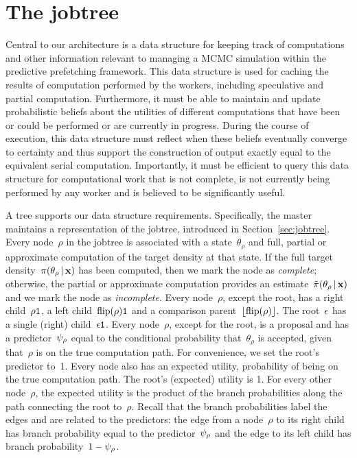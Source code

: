 \documentclass[angelino.tex]{subfiles}
\begin{document}

\section{The jobtree}
\label{sec:the-jobtree}

Central to our architecture is a data structure for
keeping track of computations and other information relevant to managing a
MCMC simulation within the predictive prefetching framework.
%
This data structure is used for caching the results of computation performed by
the workers, including speculative and partial computation.
%
Furthermore, it must be able to maintain and update probabilistic beliefs about
the utilities of different computations that have been or could be performed
or are currently in progress.
%
During the course of execution, this data structure must reflect when
these beliefs eventually converge to certainty and thus support the construction
of output exactly equal to the equivalent serial computation.
%
Importantly, it must be efficient to query this data structure for computational
work that is not complete, is not currently being performed by any worker
and is believed to be significantly useful.
%

A tree supports our data structure requirements.
%
Specifically, the master maintains a representation of the jobtree,
introduced in Section~\ref{sec:jobtree}.
%
Every node~$\rho$ in the jobtree is associated with %
a state~$\theta_\rho$ and full, partial or approximate computation of the target
density at that state.
If the full target density~$\pi(\theta_\rho \,|\, \mathbf{x})$ has been computed,
then we mark the node as \emph{complete}; otherwise, the partial or approximate
computation provides an estimate~$\tilde\pi(\theta_\rho \,|\, \mathbf{x})$
and we mark the node as \emph{incomplete}.
%
Every node~$\rho$, except the root, has a right child~$\rho\texttt{1}$,
a left child~${\text{flip}(\rho)}\texttt{1}$ and
a comparison parent~${\lfloor{\text{flip}(\rho)}\rfloor}$.
The root~$\epsilon$ has a single (right) child~$\epsilon\texttt{1}$.
%
Every node~$\rho$, except for the root, is a proposal and
has a predictor~$\psi_{\rho}$ equal to the conditional probability
that~$\theta_\rho$ is accepted, given that~$\rho$ is on the true computation path.
%
%
%
For convenience, we set the root's predictor to~1.
%
Every node also has an expected utility, \ie probability of being on the
true computation path.
The root's (expected) utility is 1.
For every other node~$\rho$, the expected utility is the product of the branch 
probabilities along the path connecting the root to~$\rho$.
Recall that the branch probabilities label the edges and are related to the
predictors: the edge from a node~$\rho$ to its right child has branch
probability equal to the predictor~$\psi_{\rho}$ and the edge to its left
child has branch probability~${1 - \psi_{\rho}}$.
\end{document}
